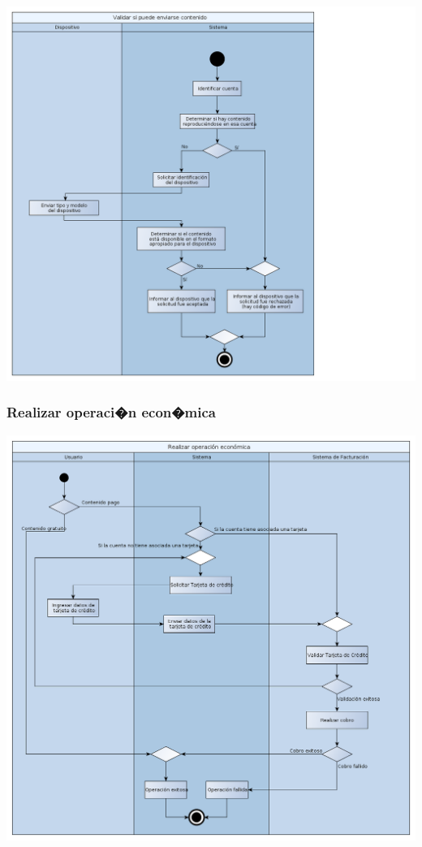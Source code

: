 \documentclass[11pt, a4paper, spanish]{article}
\begin{document}
{	\begin{center}
		\includegraphics[scale=0.37]{Diagramas/07-ValidarSiPuedeEnviarseContenidoDA.png}
	\end{center}

\newpage

\subsubsection{Realizar operaci�n econ�mica}

	\begin{center}
		\includegraphics[scale=0.37]{Diagramas/08-RealizarOperacionEconomicaDA.png}
	\end{center}

}
\end{document}
